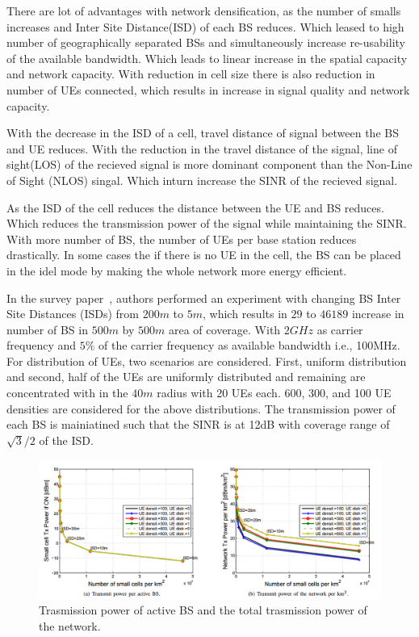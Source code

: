 \documentclass[12pt,onecolumn]{IEEEtran}
\begin{document}
There are lot of advantages with network densification, as the number of smalls increases and Inter Site Distance(ISD) of each BS reduces. Which leased to high number of geographically separated BSs and simultaneously increase re-usability of the available bandwidth. Which leads to linear increase in the spatial capacity and network capacity.
With reduction in cell size there is also reduction in number of UEs connected, which results in increase in signal quality and network capacity.

With the decrease in the ISD of a cell, travel distance of signal between the BS and UE reduces. With the reduction in the travel distance of the signal, line of sight(LOS) of the recieved signal is more dominant component than the Non-Line of Sight (NLOS) singal. Which inturn increase the SINR of the recieved signal.

As the ISD of the cell reduces the distance between the UE and BS reduces. Which reduces the transmission power of the signal while maintaining the SINR. With more number of BS, the number of UEs per base station reduces drastically. In some cases the if there is no UE in the cell, the BS can be placed in the idel mode by making the whole network more energy efficient.

In the survey paper~\cite{main_paper}, authors performed an experiment with changing BS Inter Site Distances (ISDs) from $200m$ to $5m$, which results in $29$ to $46189$ increase in number of BS in $500m$ by $500m$ area of coverage. With $2GHz$ as carrier frequency and $5\%$ of the carrier frequency as available bandwidth i.e., 100MHz. For distribution of UEs, two scenarios are considered. First, uniform distribution and second, half of the UEs are uniformly distributed and remaining are concentrated with in the $40m$ radius with 20 UEs each. 600, 300, and 100 UE densities are considered for the above distributions. The transmission power of each BS is mainiatined such that the SINR is at 12dB with coverage range of $\sqrt{3}/2$ of the ISD.

\begin{figure}[ht]
\includegraphics[scale=0.4]{tx_pow}
\centering
\caption{Trasmission power of active BS and the total trasmission power of the network.~\cite{main_paper}}
\label{fig:TXP}
\end{figure}
\end{document}
